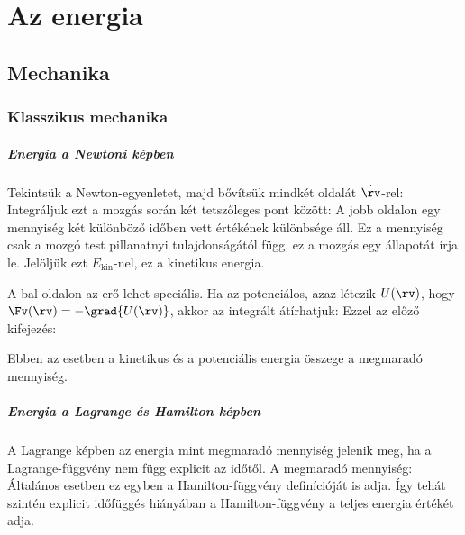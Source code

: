 \chapter{Az energia}

 \section{Mechanika}
  
  \subsection{Klasszikus mechanika}
   
   \paragraph{Energia a Newtoni képben}
    
    Tekintsük a Newton-egyenletet, majd bővítsük mindkét oldalát $\dot{\rv}$-rel:
    Integráljuk ezt a mozgás során két tetszőleges pont között:
    A jobb oldalon egy mennyiség két különböző időben vett értékének különbsége áll.
   Ez a mennyiség csak a mozgó test pillanatnyi tulajdonságától függ, ez a mozgás egy állapotát írja le.
   Jelöljük ezt $E_\text{kin}$-nel, ez a kinetikus energia. 
    
    A bal oldalon az erő lehet speciális.
   Ha az potenciálos, azaz létezik $U(\rv)$, hogy $\Fv(\rv)=-\grad{U(\rv)}$, akkor az integrált átírhatjuk: 
    Ezzel az előző kifejezés:
    
    Ebben az esetben a kinetikus és a potenciális energia összege a megmaradó mennyiség. 
    
   \paragraph{Energia a Lagrange és Hamilton képben}
    
    A Lagrange képben az energia mint megmaradó mennyiség jelenik meg, ha a Lagrange-függvény nem függ explicit az időtől.
   A megmaradó mennyiség:
    Általános esetben ez egyben a Hamilton-függvény definícióját is adja. Így tehát szintén explicit időfüggés hiányában a Hamilton-függvény a teljes energia értékét adja. 
    
